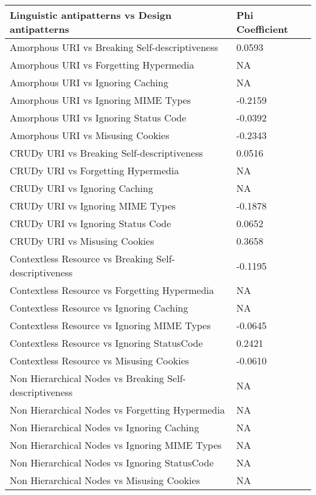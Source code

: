 \documentclass[a4paper,12pt]{article}
\begin{document}
\begin{table}[hbt!]
    \centering
       \begin{tabular}{|p{90mm}|p{50mm}|}
\hline \textbf{Linguistic antipatterns vs Design antipatterns} & \textbf{Phi Coefficient} 
\\ \hline 
Amorphous URI vs Breaking Self-descriptiveness & 0.0593
\\ \hline
Amorphous URI vs Forgetting Hypermedia & NA
\\ \hline
Amorphous URI vs Ignoring Caching & NA
\\ \hline
Amorphous URI vs Ignoring MIME Types & -0.2159
\\ \hline
Amorphous URI vs Ignoring Status Code & -0.0392
\\ \hline
Amorphous URI vs Misusing Cookies & -0.2343
\\ \hline
CRUDy URI vs Breaking Self-descriptiveness & 0.0516
\\ \hline
CRUDy URI vs Forgetting Hypermedia & NA
\\ \hline
CRUDy URI vs Ignoring Caching & NA
\\ \hline
CRUDy URI vs Ignoring MIME Types & -0.1878
\\ \hline
CRUDy URI vs Ignoring Status Code & 0.0652
\\ \hline
CRUDy URI vs Misusing Cookies & 0.3658
\\ \hline
Contextless Resource vs Breaking Self-descriptiveness & -0.1195
\\ \hline
Contextless Resource vs Forgetting Hypermedia & NA
\\ \hline
Contextless Resource vs Ignoring Caching & NA
\\ \hline
Contextless Resource vs Ignoring MIME Types & -0.0645
\\ \hline
Contextless Resource vs Ignoring StatusCode & 0.2421
\\ \hline
Contextless Resource vs Misusing Cookies & -0.0610
\\ \hline
Non Hierarchical Nodes vs Breaking Self-descriptiveness & NA
\\ \hline
Non Hierarchical Nodes vs Forgetting Hypermedia & NA
\\ \hline
Non Hierarchical Nodes vs Ignoring Caching & NA
\\ \hline
Non Hierarchical Nodes vs Ignoring MIME Types & NA
\\ \hline
Non Hierarchical Nodes vs Ignoring StatusCode & NA
\\ \hline
Non Hierarchical Nodes vs Misusing Cookies & NA

\end{tabular}
\end{table}
\end{document}
